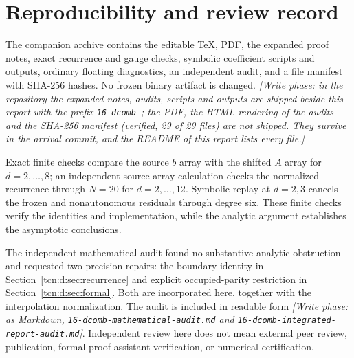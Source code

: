 \documentclass[11pt,letterpaper]{article}
\theoremstyle{remark}
\begin{document}
\section{Reproducibility and review record}\label{tcn:d:sec:record}
The companion archive contains the editable TeX, PDF, the expanded proof notes, exact recurrence and gauge checks, symbolic coefficient scripts and outputs, ordinary floating diagnostics, an independent audit, and a file manifest with SHA-256 hashes. No frozen binary artifact is changed. \emph{[Write phase: in the repository the expanded notes, audits, scripts and outputs are shipped beside this report with the prefix \textup{\nolinkurl{16-dcomb-}}; the PDF, the HTML rendering of the audits and the SHA-256 manifest (verified, 29 of 29 files) are not shipped. They survive in the arrival commit, and the README of this report lists every file.]}

Exact finite checks compare the source $b$ array with the shifted $A$ array for $d=2,\ldots,8$; an independent source-array calculation checks the normalized recurrence through $N=20$ for $d=2,\ldots,12$. Symbolic replay at $d=2,3$ cancels the frozen and nonautonomous residuals through degree six. These finite checks verify the identities and implementation, while the analytic argument establishes the asymptotic conclusions.

The independent mathematical audit found no substantive analytic obstruction and requested two precision repairs: the boundary identity in Section~\ref{tcn:d:sec:recurrence} and explicit occupied-parity restriction in Section~\ref{tcn:d:sec:formal}. Both are incorporated here, together with the interpolation normalization. The audit is included in readable form \emph{[Write phase: as Markdown, \textup{\nolinkurl{16-dcomb-mathematical-audit.md}} and \textup{\nolinkurl{16-dcomb-integrated-report-audit.md}}]}. Independent review here does not mean external peer review, publication, formal proof-assistant verification, or numerical certification.
\end{document}
